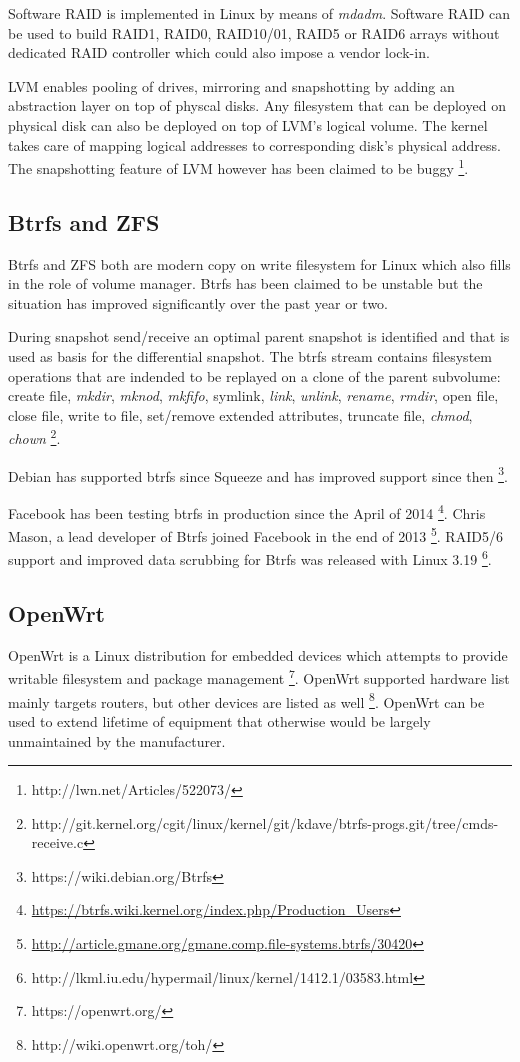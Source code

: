 \documentclass{article}
\begin{document}
Software RAID is implemented in Linux by means of \emph{mdadm}. Software RAID
can be used to build RAID1, RAID0, RAID10/01, RAID5 or RAID6 arrays without
dedicated RAID controller which could also impose a vendor lock-in.

LVM enables pooling of drives, mirroring and snapshotting by adding an
abstraction layer on top of physcal disks. Any filesystem that can be deployed
on physical disk can also be deployed on top of LVM's logical volume. The
kernel takes care of mapping logical addresses to corresponding disk's physical
address. The snapshotting feature of LVM however has been claimed to be buggy
\footnote{http://lwn.net/Articles/522073/}.

\subsection{Btrfs and ZFS}

Btrfs and ZFS both are modern copy on write filesystem for Linux which also
fills in the role of volume manager. Btrfs has been claimed to be unstable but
the situation has improved significantly over the past year or two. 

During snapshot send/receive an optimal parent snapshot is identified and that
is used as basis for the differential snapshot. The btrfs stream contains
filesystem operations that are indended to be replayed on a clone of the
parent subvolume: create file, \emph{mkdir}, \emph{mknod}, \emph{mkfifo},
symlink, \emph{link}, \emph{unlink}, \emph{rename}, \emph{rmdir}, open file,
close file, write to file, set/remove extended attributes, truncate file,
\emph{chmod}, \emph{chown}
\footnote{http://git.kernel.org/cgit/linux/kernel/git/kdave/btrfs-progs.git/tree/cmds-receive.c}.

Debian has supported btrfs since Squeeze and has improved support since then
\footnote{https://wiki.debian.org/Btrfs}.  

Facebook has been testing btrfs in production since the April of 2014
\footnote{\url{https://btrfs.wiki.kernel.org/index.php/Production_Users}}.
Chris Mason, a lead developer of Btrfs joined Facebook in the end of 2013
\footnote{\url{http://article.gmane.org/gmane.comp.file-systems.btrfs/30420}}.
RAID5/6 support and improved data scrubbing for Btrfs was released with Linux
3.19 \footnote{http://lkml.iu.edu/hypermail/linux/kernel/1412.1/03583.html}.

\subsection{OpenWrt}
OpenWrt is a Linux distribution for embedded devices which attempts to provide
writable filesystem and package management \footnote{https://openwrt.org/}.
OpenWrt supported hardware list mainly targets routers, but other devices are
listed as well \footnote{http://wiki.openwrt.org/toh/}. OpenWrt can be used to
extend lifetime of equipment that otherwise would be largely unmaintained by the
manufacturer.
\end{document}
